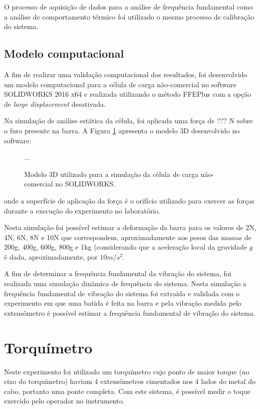 \documentclass[a4paper]{instrumentacao}
\begin{document}
O processo de aquisição de dados para a análise de frequência fundamental como a análise de comportamento térmico foi utilizado o mesmo processo de calibração do sistema.

\subsection{Modelo computacional}
A fim de realizar uma validação computacional dos resultados, foi desenvolvido um modelo computacional para a célula de carga não-comercial no software SOLIDWORKS 2016 x64 e realizada utilizando o método FFEPlus com a opção de \textit{large displacement} desativada.

Na simulação de análise estática da célula, foi aplicada uma força de ??? N  sobre o furo presente na barra. A Figura \ref{fig:celula-nao-comercial-solid-modelo} apresenta o modelo 3D desenvolvido no software:

\begin{figure}[H]
\center
...
\caption{Modelo 3D utilizado para a simulação da célula de carga não-comercial no SOLIDWORKS.}
\label{fig:celula-nao-comercial-solid-modelo}
\end{figure}

\noindent onde a superfície de aplicação da força é o orifício utilizado para exercer as forças durante a execução do experimento no laboratório.

Nesta simulação foi possível estimar a deformação da barra para os valores de 2N, 4N, 6N, 8N e 10N que correspondem, aproximadamente aos pesos das massas de 200g, 400g, 600g, 800g e 1kg (considerando que a aceleração local da gravidade $g$ é dada, aproximadamente, por $10 m/s^2$.

A fim de determinar a frequência fundamental da vibração do sistema, foi realizada uma simulação dinâmica de frequência do sistema. Nesta simulação a frequência fundamental de vibração do sistema foi extraída e validada com o experimento em que uma batida é feita na barra e pela vibração medida pelo extensômetro é possível estimar a frequência fundamental de vibração do sistema.


\section{Torquímetro}
Neste experimento foi utilizado um torquímetro cujo ponto de maior torque (no eixo do torquímetro) haviam 4 extensômetros cimentados nos 4 lados do metal do cabo, portanto uma ponte completa. Com este sistema, é possível medir o toque exercido pelo operador no instrumento.
\end{document}
